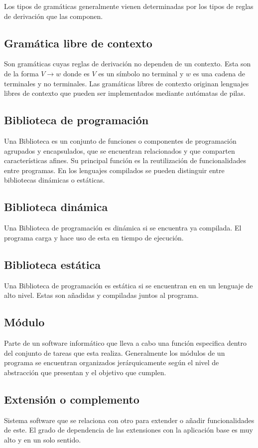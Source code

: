 Los tipos de gramáticas generalmente vienen determinadas por los tipos de reglas de derivación que las componen.

\subsection {Gramática libre de contexto}
Son gramáticas cuyas reglas de derivación no dependen de un contexto. Esta son de la 
forma $V\rightarrow w$ donde es $V$ es un símbolo no terminal y $w$ es una cadena de terminales y no terminales.
Las gramáticas libres de contexto originan lenguajes libres de contexto que pueden ser implementados mediante
autómatas de pilas. 

\subsection {Biblioteca de programación}
Una Biblioteca es un conjunto de funciones o componentes de programación agrupados y encapsulados, que se encuentran relacionados y que comparten características afines. 
Su principal función es la reutilización de funcionalidades entre programas. En los lenguajes compilados se pueden distinguir entre bibliotecas dinámicas o estáticas.

\subsection {Biblioteca dinámica}
Una Biblioteca de programación es dinámica si se encuentra ya compilada. El programa carga y hace uso de esta en tiempo de ejecución.

\subsection {Biblioteca estática}
Una Biblioteca de programación es estática si se encuentran en en un lenguaje de alto nivel. Estas son añadidas y compiladas juntos al programa.

\subsection {Módulo}
Parte de un software informático que lleva a cabo una función especifica dentro del conjunto de tareas que esta realiza. Generalmente los módulos
de un programa se encuentran organizados jerárquicamente según el nivel de abstracción que presentan y el objetivo que cumplen.

\subsection {Extensión o complemento}
Sistema software que se relaciona con otro para extender o añadir funcionalidades de este. El grado de dependencia de las extensiones con la
aplicación base es muy alto y en un solo sentido. 

